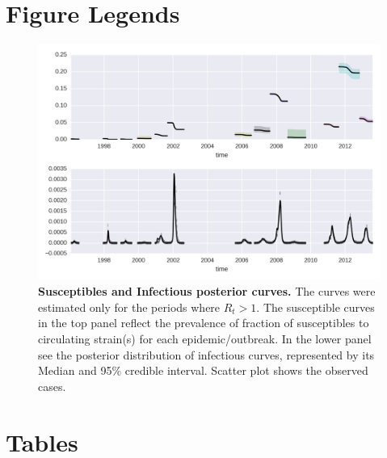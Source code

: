 
\section*{Figure Legends}
%
\begin{figure}
\begin{center}
\includegraphics[width=.9\textwidth]{./concat_SI.png}
\end{center}
\caption{
{\bf Susceptibles and Infectious posterior curves.}  The curves were estimated 
only for the periods where $R_t> 1$.  The susceptible curves in the top panel 
reflect the prevalence of fraction of susceptibles to circulating strain(s) for 
each epidemic/outbreak. In the lower panel see the posterior distribution 
of infectious curves, represented by its Median and 95\% credible interval. 
Scatter plot shows the observed cases.
}
\label{Fig:S0}
\end{figure}



\section*{Tables}
% 
%
%



